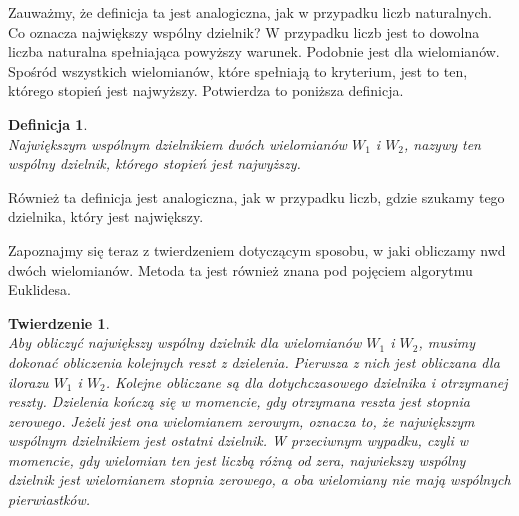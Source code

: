 \documentclass[oneside,a4paper]{book}
\newtheorem{theorem}{Twierdzenie}
\newtheorem{definition}{Definicja}
\begin{document}
	Zauważmy, że definicja ta jest analogiczna, jak w przypadku liczb naturalnych.
	Co oznacza największy wspólny dzielnik? W przypadku liczb jest to dowolna liczba naturalna spełniająca powyższy warunek. Podobnie jest dla wielomianów. Spośród wszystkich wielomianów, które spełniają to kryterium, jest to ten, którego stopień jest najwyższy. Potwierdza to poniższa definicja.
	
	\begin{definition}
		$ $\\
		Największym wspólnym dzielnikiem dwóch wielomianów $W_1$ i $W_2$, nazywy ten wspólny dzielnik, którego stopień jest najwyższy.
	\end{definition}
	
	Również ta definicja jest analogiczna, jak w przypadku liczb, gdzie szukamy tego dzielnika, który jest największy.
	
	Zapoznajmy się teraz z twierdzeniem dotyczącym sposobu, w jaki obliczamy nwd dwóch wielomianów. Metoda ta jest również znana pod pojęciem algorytmu Euklidesa.
	
	\begin{theorem}
		$ $\\
		Aby obliczyć największy wspólny dzielnik dla wielomianów $W_1$ i $W_2$, musimy dokonać obliczenia kolejnych reszt z dzielenia. Pierwsza z nich jest obliczana dla ilorazu $W_1$ i $W_2$. Kolejne obliczane są dla dotychczasowego dzielnika i otrzymanej reszty. Dzielenia kończą się w momencie, gdy otrzymana reszta jest stopnia zerowego. Jeżeli jest ona wielomianem zerowym, oznacza to, że największym wspólnym dzielnikiem jest ostatni dzielnik. W przeciwnym wypadku, czyli w momencie, gdy wielomian ten jest liczbą różną od zera, najwiekszy wspólny dzielnik jest wielomianem stopnia zerowego, a oba wielomiany nie mają wspólnych pierwiastków. 
	\end{theorem}
	
\end{document}
